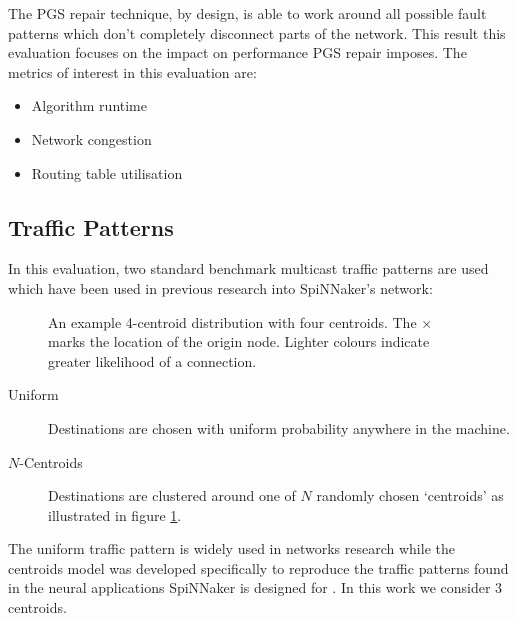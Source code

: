 		The PGS repair technique, by design, is able to work around all possible
		fault patterns which don't completely disconnect parts of the network. This
		result this evaluation focuses on the impact on performance PGS repair
		imposes. The metrics of interest in this evaluation are:
		
		\begin{itemize}
			\item Algorithm runtime
			\item Network congestion
			\item Routing table utilisation
		\end{itemize}
		
		\subsection{Traffic Patterns}
			
			In this evaluation, two standard benchmark multicast traffic patterns are
			used which have been used in previous research into SpiNNaker's network:
			
			\begin{figure}
				\center
				
				\caption{An example 4-centroid distribution with four centroids. The
				$\times$ marks the location of the origin node. Lighter colours
				indicate greater likelihood of a connection.}
				\label{fig:traffic-distribution-centroids}
			\end{figure}
			
			\begin{description}
				
				\item[Uniform] Destinations are chosen with uniform probability
				anywhere in the machine.
				
				\item[$N$-Centroids] Destinations are clustered around one of $N$
				randomly chosen `centroids' as illustrated in figure
				\ref{fig:traffic-distribution-centroids}.
				
			\end{description}
			
			The uniform traffic pattern is widely used in networks research
			\cite{dally04,davies12} while the centroids model was developed
			specifically to reproduce the traffic patterns found in the neural
			applications SpiNNaker is designed for \cite{navaridas14}. In this work
			we consider 3 centroids.
		
